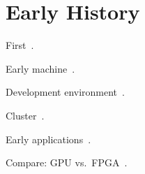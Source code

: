 \section{Early History}
\label{sec:history}

First~\cite{khdo06}.

Early machine~\cite{kdh+06}.

Development environment~\cite{cft+10}.

Cluster~\cite{tl10}.

Early applications~\cite{khdo06,shsc08,tl10}.

Compare: GPU vs.~FPGA~\cite{jpbc10,sww+10}.
